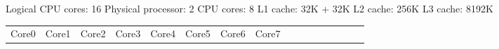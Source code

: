 \documentclass{article}
\begin{document}
\usepackage{multirow}

Logical CPU cores: 16
Physical processor: 2
CPU cores: 8
L1 cache: 32K + 32K
L2 cache: 256K
L3 cache: 8192K

\begin{center}
    \begin{tabular} { |c|c|c|c|c|c|c|c|c|c|c|c|c|c|c|c| }
        \hline
        Core0 & Core1 & Core2 & Core3 & Core4 & Core5 & Core6 & Core7 \\
    \end{tabular}
\end{center}
\end{document}
